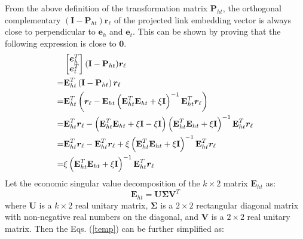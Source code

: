 \documentclass[9pt]{sig-alternate-05-2015}
\begin{document}
From the above definition of the transformation matrix $\textbf{P}_{ht}$, the orthogonal complementary $(\textbf{I} -  \textbf{P}_{ht}) \bm{r}_{\ell}$ of the projected link embedding vector  is always close to perpendicular to  $\bm{e}_h$ and $\bm{e}_t$. This can be shown by proving that the following expression is close to $\bm{0}$.
\begin{align}
 &\begin{bmatrix} \bm{e}_h^{T} \\ \bm{e}_t^{T} \end{bmatrix} (\textbf{I} -  \textbf{P}_{ht})\bm{r}_{\ell} \notag  \\
=&\textbf{E}_{ht}^{T}\left(\textbf{I} -  \textbf{P}_{ht}\right)\bm{r}_{\ell}  \notag \\
=&\textbf{E}_{ht}^{T}\left(\bm{r}_{\ell} -  \textbf{E}_{ht}\left(\textbf{E}_{ht}^{T} \textbf{E}_{ht} + \xi \textbf{I} \right)^{-1} \textbf{E}_{ht}^{T} \bm{r}_{\ell}\right)  \notag \\
=&\textbf{E}_{ht}^{T}\bm{r}_{\ell} - \left (\textbf{E}_{ht}^{T} \textbf{E}_{ht}+\xi \textbf{I} - \xi \textbf{I}\right)\left(\textbf{E}_{ht}^{T} \textbf{E}_{ht} + \xi \textbf{I}\right )^{-1} \textbf{E}_{ht}^{T} \bm{r}_{\ell} \notag \\
=& \textbf{E}_{ht}^{T}\bm{r}_{\ell} - \textbf{E}_{ht}^{T} \bm{r}_{\ell}  +  \xi \left(\textbf{E}_{ht}^{T} \textbf{E}_{ht} + \xi \textbf{I}\right )^{-1} \textbf{E}_{ht}^{T} \bm{r}_{\ell}  \notag \\
=& \xi \left(\textbf{E}_{ht}^{T} \textbf{E}_{ht} + \xi \textbf{I}\right )^{-1} \textbf{E}_{ht}^{T} \bm{r}_{\ell}   \label{temp}
\end{align}
Let the economic singular value decomposition of the $k \times 2$ matrix $\textbf{E}_{ht}$ as:
\begin{equation*}
\textbf{E}_{ht} = \textbf{U} \mathbf{\Sigma} \textbf{V}^{T}
\end{equation*}
where \textbf{U} is a $k \times 2$ real unitary matrix, $\mathbf{\Sigma}$ is a $2 \times 2$ rectangular diagonal matrix with non-negative real numbers on the diagonal, and \textbf{V} is a $2 \times 2$ real unitary matrix.
Then the Eqs. (\ref{temp}) can be further simplified as:
\end{document}
